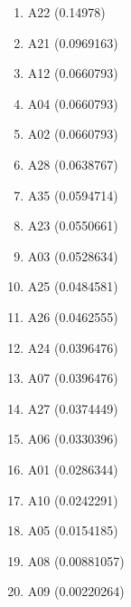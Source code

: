 \begin{enumerate}
\item A22 (0.14978)
\item A21 (0.0969163)
\item A12 (0.0660793)
\item A04 (0.0660793)
\item A02 (0.0660793)
\item A28 (0.0638767)
\item A35 (0.0594714)
\item A23 (0.0550661)
\item A03 (0.0528634)
\item A25 (0.0484581)
\item A26 (0.0462555)
\item A24 (0.0396476)
\item A07 (0.0396476)
\item A27 (0.0374449)
\item A06 (0.0330396)
\item A01 (0.0286344)
\item A10 (0.0242291)
\item A05 (0.0154185)
\item A08 (0.00881057)
\item A09 (0.00220264)
\end{enumerate}